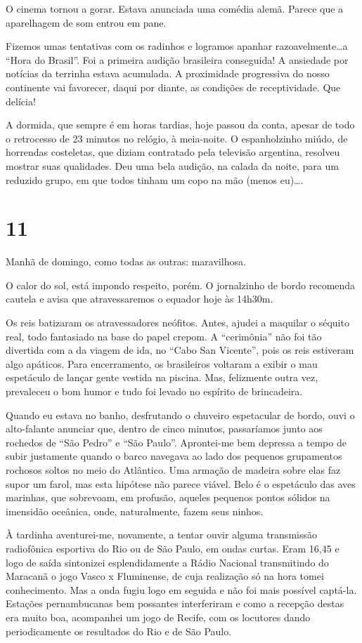 O cinema tornou a gorar. Estava anunciada uma comédia alemã. Parece que a aparelhagem de som entrou em pane.

Fizemos umas tentativas com os radinhos e logramos apanhar razoavelmente\ldots a “Hora do Brasil”. Foi a primeira audição brasileira conseguida! A ansiedade por notícias da terrinha estava acumulada. A proximidade progressiva do nosso continente vai favorecer, daqui por diante, as condições de receptividade. Que delícia!

A dormida, que sempre é em horas tardias, hoje passou da conta, apesar de todo o retrocesso de 23 minutos no relógio, à meia-noite. O espanholzinho miúdo, de horrendas costeletas, que diziam contratado pela televisão argentina, resolveu mostrar suas qualidades. Deu uma bela audição, na calada da noite, para um reduzido grupo, em que todos tinham um copo na mão (menos eu)\ldots.

\section*{11 \adfflatleafright {}}
Manhã de domingo, como todas as outras: maravilhosa.

O calor do sol, está impondo respeito, porém. O jornalzinho de bordo recomenda cautela e avisa que atravessaremos o equador hoje às 14h30m.

Os reis batizaram os atravessadores neófitos. Antes, ajudei a maquilar o séquito real, todo fantasiado na base do papel crepom. A “cerimônia” não foi tão divertida com a da viagem de ida, no “Cabo San Vicente”, pois os reis estiveram algo apáticos. Para encerramento, os brasileiros voltaram a exibir o mau espetáculo de lançar gente vestida na piscina. Mas, felizmente outra vez, prevaleceu o bom humor e tudo foi levado no espírito de brincadeira.

Quando eu estava no banho, desfrutando o chuveiro espetacular de bordo, ouvi o alto-falante anunciar que, dentro de cinco minutos, passaríamos junto aos rochedos de “São Pedro” e “São Paulo”. Aprontei-me bem depressa a tempo de subir justamente quando o barco navegava ao lado dos pequenos grupamentos rochosos soltos no meio do Atlântico. Uma armação de madeira sobre elas faz supor um farol, mas esta hipótese não parece viável. Belo é o espetáculo das aves marinhas, que sobrevoam, em profusão, aqueles pequenos pontos sólidos na imensidão oceânica, onde, naturalmente, fazem seus ninhos.

À tardinha aventurei-me, novamente, a tentar ouvir alguma transmissão radiofônica esportiva do Rio ou de São Paulo, em ondas curtas. Eram 16,45 e logo de saída sintonizei esplendidamente a Rádio Nacional transmitindo do Maracanã o jogo Vasco x Fluminense, de cuja realização só na hora tomei conhecimento. Mas a onda fugiu logo em seguida e não foi mais possível captá-la. Estações pernambucanas bem possantes interferiram e como a recepção destas era muito boa, acompanhei um jogo de Recife, com os locutores dando periodicamente os resultados do Rio e de São Paulo.

